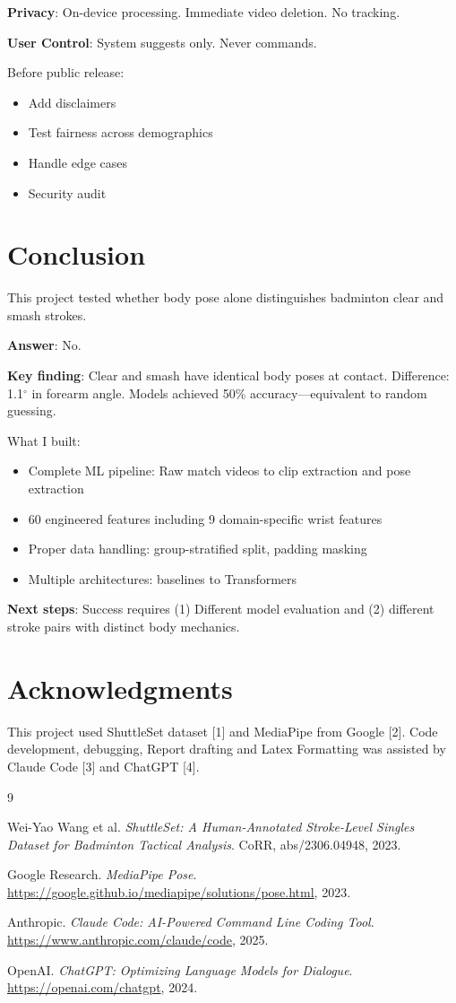 \documentclass[11pt,a4paper]{article}
\begin{document}
\textbf{Privacy}: On-device processing. Immediate video deletion. No tracking.

\textbf{User Control}: System suggests only. Never commands.

Before public release:
\begin{itemize}
\item Add disclaimers
\item Test fairness across demographics
\item Handle edge cases
\item Security audit
\end{itemize}

\section{Conclusion}

This project tested whether body pose alone distinguishes badminton clear and smash strokes.

\textbf{Answer}: No.

\textbf{Key finding}: Clear and smash have identical body poses at contact. Difference: 1.1$^\circ$ in forearm angle. Models achieved 50\% accuracy---equivalent to random guessing.

What I built:
\begin{itemize}
\item Complete ML pipeline: Raw match videos to clip extraction and pose extraction
\item 60 engineered features including 9 domain-specific wrist features
\item Proper data handling: group-stratified split, padding masking
\item Multiple architectures: baselines to Transformers
\end{itemize}

\textbf{Next steps}: Success requires (1) Different model evaluation and (2) different stroke pairs with distinct body mechanics.

\section*{Acknowledgments}

This project used ShuttleSet dataset [1] and MediaPipe from Google [2]. Code development, debugging, Report drafting and Latex Formatting  was assisted by Claude Code [3] and ChatGPT [4]. 
\begin{thebibliography}{9}

Wei-Yao Wang et al. \textit{ShuttleSet: A Human-Annotated Stroke-Level Singles Dataset for Badminton Tactical Analysis}. CoRR, abs/2306.04948, 2023.

Google Research. \textit{MediaPipe Pose}. \url{https://google.github.io/mediapipe/solutions/pose.html}, 2023.

Anthropic. \textit{Claude Code: AI-Powered Command Line Coding Tool}. \url{https://www.anthropic.com/claude/code}, 2025.

OpenAI. \textit{ChatGPT: Optimizing Language Models for Dialogue}. \url{https://openai.com/chatgpt}, 2024.


\end{thebibliography}
\end{document}
